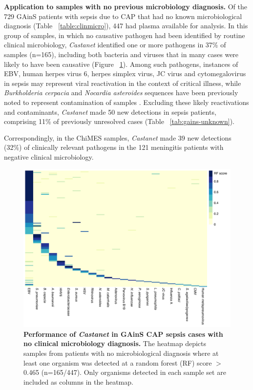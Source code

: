 \textbf{Application to samples with no previous microbiology diagnosis.}
Of the 729 GAinS patients with sepsis due to CAP that had no known microbiological diagnosis (Table ~\ref{table:clinmicro}), 447 had plasma available for analysis. In this group of samples, in which no causative pathogen had been identified by routine clinical microbiology, \textit{Castanet} identified one or more pathogens in 37\% of samples (n=165), including both bacteria and viruses that in many cases were likely to have been causative (Figure ~\ref{fig:rf-unknown}). Among such pathogens, instances of EBV, human herpes virus 6, herpes simplex virus, JC virus and cytomegalovirus in sepsis may represent viral reactivation in the context of critical illness, while \textit{Burkholderia cerpacia} and \textit{Nocardia asteroides} sequences have been previously noted to represent contamination of samples \parencite{Salter2014}. Excluding these likely reactivations and contaminants, \textit{Castanet} made 50 new detections in sepsis patients, comprising 11\% of previously unresolved cases (Table ~\ref{tab:gains-unknown}). 

Correspondingly, in the ChiMES samples, \textit{Castanet} made 39 new detections (32\%) of clinically relevant pathogens in the 121 meningitis patients with negative clinical microbiology. 
 
\begin{figure}[htbp]
\centering
\includegraphics[scale=0.8]{./Results2/Images/rf-gains-unknown.pdf}
\caption[GAinS cases with no clinical microbiology diagnosis]{\textbf{Performance of \textit{Castanet} in GAinS CAP sepsis cases with no clinical microbiology diagnosis.} The heatmap depicts samples from patients with no microbiological diagnosis where at least one organism was detected at a random forest (RF) score $>$0.465 (n=165/447). Only organisms detected in each sample set are included as columns in the heatmap.}
\label{fig:rf-unknown}
\end{figure}
\FloatBarrier

